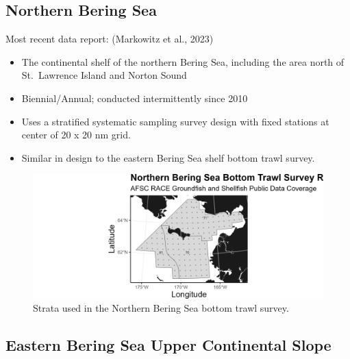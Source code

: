 \documentclass[
  letterpaper,
  oneside,
  open=any]{scrbook}
\providecommand{\tightlist}{%
  \setlength{\itemsep}{0pt}\setlength{\parskip}{0pt}}\usepackage{longtable,booktabs,array}
\begin{document}
\hypertarget{northern-bering-sea}{%
\subsection{\texorpdfstring{\textbf{Northern Bering
Sea}}{Northern Bering Sea}}\label{northern-bering-sea}}

Most recent data report: (Markowitz et al., 2023)

\begin{itemize}
\tightlist
\item
  The continental shelf of the northern Bering Sea, including the area
  north of St.~Lawrence Island and Norton Sound
\item
  Biennial/Annual; conducted intermittently since 2010
\item
  Uses a stratified systematic sampling survey design with fixed
  stations at center of 20 x 20 nm grid.
\item
  Similar in design to the eastern Bering Sea shelf bottom trawl survey.
\end{itemize}

\begin{figure}

{\centering \includegraphics[width=7in,height=\textheight]{content/../img/survey_plot_nbs.png}

}

\caption{Strata used in the Northern Bering Sea bottom trawl survey.}

\end{figure}

\hypertarget{eastern-bering-sea-upper-continental-slope}{%
\subsection{\texorpdfstring{\textbf{Eastern Bering Sea Upper Continental
Slope}}{Eastern Bering Sea Upper Continental Slope}}\label{eastern-bering-sea-upper-continental-slope}}
\end{document}
